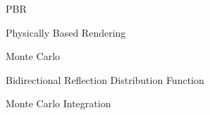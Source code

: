 \documentclass[cic,tc,english]{iiufrgs}
\begin{document}
\listoffigures


\begin{listofabbrv}{PBR}
    \item[PBR] Physically Based Rendering
    \item[MC] Monte Carlo
    \item[BRDF] Bidirectional Reflection Distribution Function
    \item[MCI] Monte Carlo Integration
\end{listofabbrv}


\tableofcontents











\end{document}
